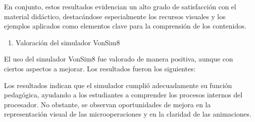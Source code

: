 \documentclass[12pt,oneside]{templates/unerthesis}
\providecommand{\tightlist}{%
  \setlength{\itemsep}{0pt}\setlength{\parskip}{0pt}}
\begin{document}
En conjunto, estos resultados evidencian un alto grado de satisfacción con el material didáctico, destacándose especialmente los recursos visuales y los ejemplos aplicados como elementos clave para la comprensión de los contenidos.

\begin{enumerate}
\def\labelenumi{\arabic{enumi}.}
\setcounter{enumi}{2}
\tightlist
\item
  Valoración del simulador VonSim8
\end{enumerate}

El uso del simulador VonSim8 fue valorado de manera positiva, aunque con ciertos aspectos a mejorar. Los resultados fueron los siguientes:

\begin{table}[!h]
\centering
\caption{\label{tab:tablaevaluacion}Evaluación de aspectos clave del simulador VonSim8}
\centering
{}
\end{table}

Los resultados indican que el simulador cumplió adecuadamente su función pedagógica, ayudando a los estudiantes a comprender los procesos internos del procesador. No obstante, se observan oportunidades de mejora en la representación visual de las microoperaciones y en la claridad de las animaciones.
\end{document}
